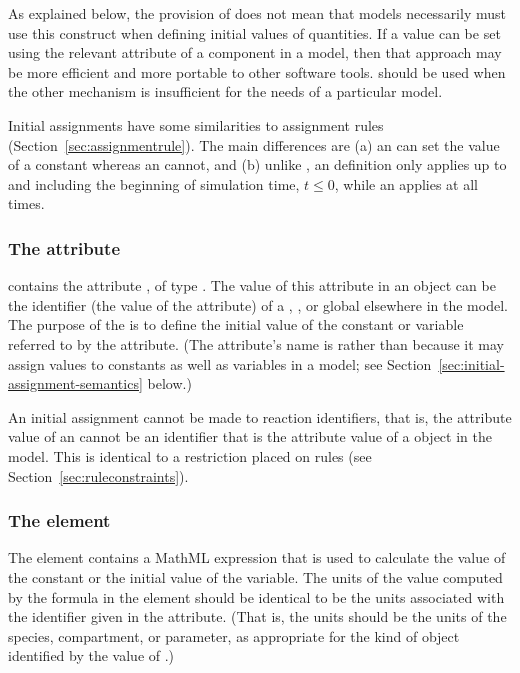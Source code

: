 As explained below, the provision of \InitialAssignment does not
mean that models necessarily must use this construct when defining
initial values of quantities.  If a value can be set
using the relevant attribute of a component in a model, then
that approach may be more efficient and more portable to other
software tools.  \InitialAssignment should be used when the other
mechanism is insufficient for the needs of a particular model.

Initial assignments have some similarities to assignment rules
(Section~\ref{sec:assignmentrule}).  The main differences are (a)
an \InitialAssignment can set the value of a constant whereas an
\AssignmentRule cannot, and (b) unlike \AssignmentRule, an
\InitialAssignment definition only applies up to and including the
beginning of simulation time, \ie $t \leq 0$, while an
\AssignmentRule applies at all times.


\subsubsection{The  attribute}

\InitialAssignment contains the attribute
, of type .  The value of this
attribute in an \InitialAssignment object can be the
identifier (\ie the value of the  attribute)
of a \Compartment, \Species, \SpeciesReference or global \Parameter 
elsewhere in the
model.  The purpose of the \InitialAssignment is to define the
initial value of the constant or variable referred to by the
 attribute.  (The attribute's
name is  rather than  because it may
assign values to constants as well as variables in a model; see
Section~\ref{sec:initial-assignment-semantics} below.)

An initial assignment cannot be made to reaction identifiers, that
is, the  attribute value of an \InitialAssignment cannot
be an identifier that is the  attribute value of a \Reaction
object in the model.  This is identical to a restriction placed on
rules (see Section~\ref{sec:ruleconstraints}).


\subsubsection{The  element}

The  element contains a MathML expression that is used
to calculate the value of the constant or the initial value of the
variable.  The units of the value computed by the formula in the
 element should be identical to be the units associated with the
identifier given in the  attribute.  (That is, the units
should be the units of the species, compartment, or parameter, as
appropriate for the kind of object identified by the value of
.)


